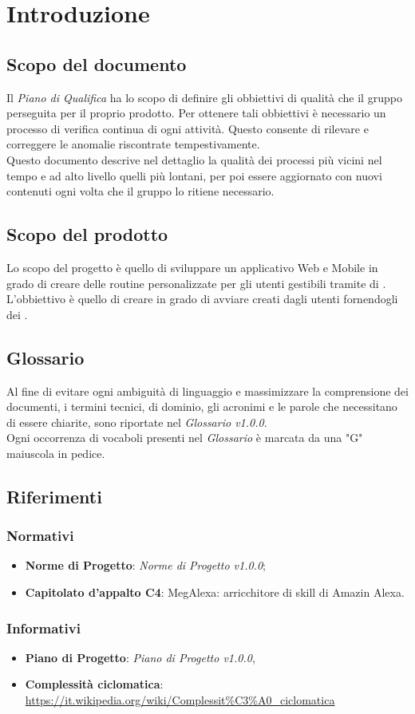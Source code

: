 \chapter{Introduzione}
\section{Scopo del documento}
Il \textit{Piano di Qualifica} ha lo scopo di definire gli obbiettivi di qualità che il gruppo perseguita per il proprio prodotto. Per ottenere tali obbiettivi è necessario un processo di verifica continua di ogni attività. Questo consente di rilevare e correggere le anomalie riscontrate tempestivamente.\\
Questo documento descrive nel dettaglio la qualità dei processi più vicini nel tempo e ad alto livello quelli più lontani, per poi essere aggiornato con nuovi contenuti ogni volta che il gruppo lo ritiene necessario.
\section{Scopo del prodotto}
Lo scopo del progetto è quello di sviluppare un applicativo Web e Mobile in grado di creare delle routine personalizzate per gli utenti gestibili tramite  di . L'obbiettivo è quello di creare  in grado di avviare  creati dagli utenti fornendogli dei .
\section{Glossario}
Al fine di evitare ogni ambiguità di linguaggio e massimizzare la comprensione dei documenti, i termini tecnici, di dominio, gli acronimi e le parole che necessitano di essere chiarite, sono riportate nel \textit{Glossario v1.0.0}.\\
Ogni occorrenza di vocaboli presenti nel \textit{Glossario} è marcata da una "G" maiuscola in pedice.
\section{Riferimenti}
\subsection{Normativi}
\begin{itemize}
	\item  \textbf{Norme di Progetto}: \textit{Norme di Progetto v1.0.0};
	\item \textbf{Capitolato d'appalto C4}: MegAlexa: arricchitore di skill di Amazin Alexa.
\end{itemize}
\subsection{Informativi}
\begin{itemize}
	\item \textbf{Piano di Progetto}: \textit{Piano di Progetto v1.0.0},
	\item \textbf{Complessità ciclomatica}: \url{https://it.wikipedia.org/wiki/Complessit\%C3\%A0_ciclomatica}
\end{itemize}
